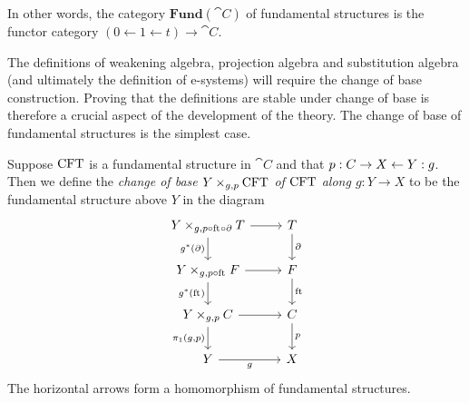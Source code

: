 In other words, the category $\mathbf{Fund}(\cat{C})$ of fundamental structures
is the functor category $(0\leftarrow 1\leftarrow t)\to\cat{C}$.

The definitions of weakening algebra, projection algebra and substitution
algebra (and ultimately the definition of e-systems) will require the
change of base construction. Proving that the definitions are stable under
change of base is therefore a crucial aspect of the development of the theory.
The change of base of fundamental structures is the simplest case.

\begin{defn}
Suppose $\mathrm{CFT}$ is a fundamental structure in $\cat{C}$ and that 
$p:C\rightarrow X\leftarrow Y:g$.
Then we define the \emph{change of base $\cobesys{Y}{\stesys}{g}{p}$ of 
$\mathrm{CFT}$ along $g:Y\to X$} to be the fundamental structure above $Y$ in the 
diagram
\begin{equation*}
\begin{tikzcd}
\cobesys{Y}{\stesyst}{g}{p\circ\eft\circ\ebd}
  \ar{r}
  \ar{d}[swap]{g^\ast(\ebd)}
  &
\stesyst
  \ar{d}{\ebd}
  \\
\cobesys{Y}{\stesysf}{g}{p\circ\eft}
  \ar{r}
  \ar{d}[swap]{g^\ast(\eft)}
  &
\stesysf
  \ar{d}{\eft}
  \\
\cobesys{Y}{\stesysc}{g}{p}
  \ar{r}
  \ar{d}[swap]{\pullbackpr{1}{g}{p}}
  &
\stesysc
  \ar{d}{p}
  \\
Y \ar{r}[swap]{g}
  &
X
\end{tikzcd}
\end{equation*}
The horizontal arrows form a homomorphism
of fundamental structures.
\end{defn}
